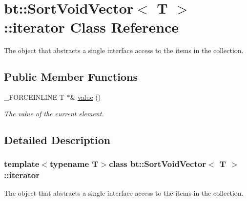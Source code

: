 \hypertarget{classbt_1_1_sort_void_vector_1_1iterator}{\section{bt\-:\-:Sort\-Void\-Vector$<$ T $>$\-:\-:iterator Class Reference}
\label{classbt_1_1_sort_void_vector_1_1iterator}
}


The object that abstracts a single interface access to the items in the collection.  


\subsection*{Public Member Functions}
\begin{DoxyCompactItemize}
\item 
\hypertarget{classbt_1_1_sort_void_vector_1_1iterator_a8a4386f2a104274a12af1f616f1755c8}{\-\_\-\-F\-O\-R\-C\-E\-I\-N\-L\-I\-N\-E T $\ast$\& \hyperlink{classbt_1_1_sort_void_vector_1_1iterator_a8a4386f2a104274a12af1f616f1755c8}{value} ()}\label{classbt_1_1_sort_void_vector_1_1iterator_a8a4386f2a104274a12af1f616f1755c8}

\begin{DoxyCompactList}\small\item\em The value of the current element. \end{DoxyCompactList}\end{DoxyCompactItemize}


\subsection{Detailed Description}
\subsubsection*{template$<$typename T$>$class bt\-::\-Sort\-Void\-Vector$<$ T $>$\-::iterator}

The object that abstracts a single interface access to the items in the collection. 